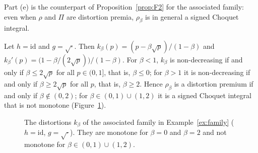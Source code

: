 Part (e) is the counterpart of Proposition~\ref{prop:F2} for the associated family: even when $\rho$ and $\Pi$ are
distortion premia, $\rho_\beta$ is in general a signed Choquet integral.

\begin{example}\label{ex:family}
Let $h=\mathrm{id}$ and $g=\sqrt{\cdot}$. Then $k_\beta(p)=(p-\beta\sqrt p)/(1-\beta)$ and
$k_\beta'(p)=\big(1-\beta/(2\sqrt p)\big)/(1-\beta)$. For $\beta<1$, $k_\beta$ is non-decreasing if and only if
$\beta\le2\sqrt p$ for all $p\in(0,1]$, that is, $\beta\le0$; for $\beta>1$ it is non-decreasing if and only if
$\beta\ge2\sqrt p$ for all $p$, that is, $\beta\ge2$. Hence $\rho_\beta$ is a distortion premium if and only if
$\beta\notin(0,2)$; for $\beta\in(0,1)\cup(1,2)$ it is a signed Choquet integral that is not monotone
(Figure~\ref{fig:family}).
\end{example}

\begin{figure}[ht]
\centering
{}
\caption{The distortions $k_\beta$ of the associated family in Example~\ref{ex:family} ($h=\mathrm{id}$,
$g=\sqrt{\cdot}$). They are monotone for $\beta=0$ and $\beta=2$ and not monotone for $\beta\in(0,1)\cup(1,2)$.}
\label{fig:family}
\end{figure}


